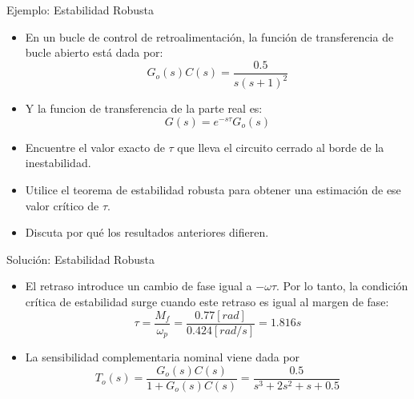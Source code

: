 \documentclass{beamer}
\begin{document}
\begin{frame}{Ejemplo: Estabilidad Robusta}
\begin{justify}
\begin{itemize}
\justifying
\item En un bucle de control de retroalimentación, la función de transferencia de bucle abierto está dada por:
 \begin{equation}\label{robustez1}
   G_o(s)C(s) = \frac{0.5}{s(s+1)^2}   
\end{equation}
\item Y la funcion de transferencia de la parte real es:
 \begin{equation}\label{robustez2}
    G(s) = e^{-s\tau}G_o(s)   
\end{equation}
\item Encuentre el valor exacto de $\tau$ que lleva el circuito cerrado al borde de la inestabilidad.
\item Utilice el teorema de estabilidad robusta para obtener una estimación de ese valor crítico de $\tau$.
\item Discuta por qué los resultados anteriores difieren.
\end{itemize}
\end{justify}
\end{frame}

\begin{frame}{Solución: Estabilidad Robusta}
\begin{justify}
\begin{itemize}
\justifying
\item El retraso introduce un cambio de fase igual a $-\omega \tau$. Por lo tanto, la condición crítica de estabilidad surge cuando este retraso es igual al margen de fase:
 \begin{equation}\label{robustez3}
    \tau = \frac{M_f}{\omega_p}=\frac{0.77[rad]}{0.424[rad/s] }  =1.816s 
\end{equation}
\item La sensibilidad complementaria nominal viene dada por
 \begin{equation}\label{robustez4}
    T_o(s) = \frac{G_o(s)C(s)}{1+G_o(s)C(s)}=\frac{0.5}{s^3+2s^2+s+0.5}
\end{equation}

\end{itemize}
\end{justify}
\end{frame}
\end{document}
